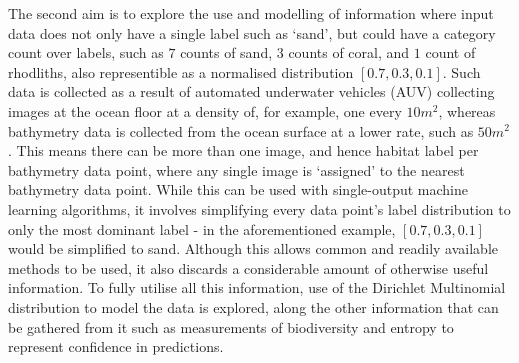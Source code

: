 The second aim is to explore the use and modelling of information where input data does not only have a single label such as `sand', but could have a category count over labels, such as $7$ counts of sand, $3$ counts of coral, and $1$ count of rhodliths, also representible as a normalised distribution $[0.7, 0.3, 0.1]$. Such data is collected as a result of automated underwater vehicles (AUV) collecting  images at the ocean floor at a density of, for example, one every $10m^2$, whereas bathymetry data is collected from the ocean surface at a lower rate, such as $50m^2$. This means there can be more than one image, and hence habitat label per bathymetry data point, where any single image is `assigned' to the nearest bathymetry data point. While this can be used with single-output machine learning algorithms, it involves simplifying every data point's label distribution to only the most dominant label - in the aforementioned example, $[0.7, 0.3, 0.1]$ would be simplified to sand. Although this allows common and readily available methods to be used, it also discards a considerable amount of otherwise useful information. To fully utilise all this information, use of the Dirichlet Multinomial distribution to model the data is explored, along the other information that can be gathered from it such as measurements of biodiversity and entropy to represent confidence in predictions.

